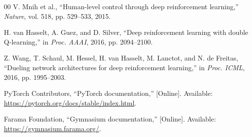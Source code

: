 \documentclass[conference]{IEEEtran}
\begin{document}
\begin{thebibliography}{00}
V. Mnih et al., ``Human-level control through deep reinforcement learning,'' \textit{Nature}, vol. 518, pp. 529--533, 2015.

H. van Hasselt, A. Guez, and D. Silver, ``Deep reinforcement learning with double Q-learning,'' in \textit{Proc. AAAI}, 2016, pp. 2094--2100.

Z. Wang, T. Schaul, M. Hessel, H. van Hasselt, M. Lanctot, and N. de Freitas, ``Dueling network architectures for deep reinforcement learning,'' in \textit{Proc. ICML}, 2016, pp. 1995--2003.

PyTorch Contributors, ``PyTorch documentation,'' [Online]. Available: \url{https://pytorch.org/docs/stable/index.html}.

Farama Foundation, ``Gymnasium documentation,'' [Online]. Available: \url{https://gymnasium.farama.org/}.
\end{thebibliography}
\end{document}
